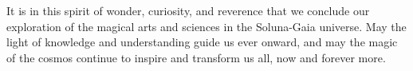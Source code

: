 \documentclass[12pt]{article}
\begin{document}
It is in this spirit of wonder, curiosity, and reverence that we conclude our exploration of the magical arts and sciences in the Soluna-Gaia universe. May the light of knowledge and understanding guide us ever onward, and may the magic of the cosmos continue to inspire and transform us all, now and forever more.
% 
% 
% 



\end{document}
